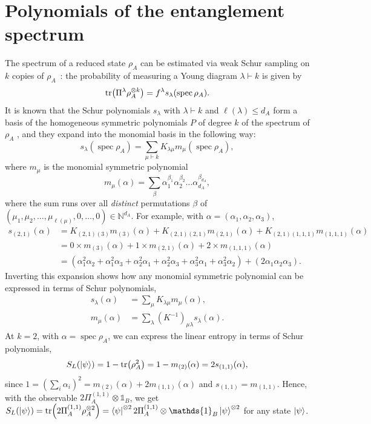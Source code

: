 \documentclass[11pt,a4paper]{report}
\DeclareMathOperator{\spec}{spec}
\newcommand{\one}{\mathds{1}}
\newcommand{\I}{\one}
\renewcommand{\a}{\alpha}
\newcommand{\N}{\mathds{N}}
\newcounter{reptag}
\newif\iftags \tagsfalse   %
\newcommand{\reptagbox}[3]{\iftags\par\smallskip\noindent\refstepcounter{reptag}%
  \fcolorbox{#1}{#1!7}{\parbox{\dimexpr\linewidth-2\fboxsep-2\fboxrule\relax}{\small
  \textcolor{#1}{\textbf{[\thereptag]\ #2.}}\ #3}}\par\smallskip\fi}
\newcommand{\detail}[1]{\reptagbox{tagD}{More detail}{#1}}
\begin{document}
\section{Polynomials of the entanglement spectrum}\label{ch:polynomial}
The spectrum of a reduced state $\rho_A$ can be estimated via weak Schur sampling on $k$ copies of $\rho_A$~\cite{Alicki1988,Keyl2001EstimatingSpectrum}: the probability of measuring a Young diagram $\lambda \vdash k$ is given by
\begin{equation}
    \tr(\Pi^\lambda \rho_A^{\otimes k}) = f^\lambda s_\lambda(\spec\rho_A).
\end{equation}
It is known that the Schur polynomials $s_\lambda$ with $\lambda \vdash k$ and $\ell(\lambda) \leq d_A$ form a basis of the homogeneous symmetric polynomials $P$ of degree $k$ of the spectrum of $\rho_A$ \cite{MacdonaldSymmFunc}, and they expand into the monomial basis in the following way:
\begin{equation}
    s_\lambda(\spec\rho_A) = \sum_{\mu \vdash k} K_{\lambda\mu}m_\mu(\spec\rho_A),
\end{equation}
where $m_\mu$ is the monomial symmetric polynomial
\begin{equation}
    m_\mu(\a) = \sum_{\beta} \a_1^{\beta_1}\a_2^{\beta_2}\dots\a_{d_A}^{\beta_{d_A}},
\end{equation}
where the sum runs over all {\em distinct} permutations $\beta$ of $(\mu_1, \mu_2, \dots, \mu_{\ell(\mu)}, 0,\dots, 0) \in \N^{d_A}$.
For example, with $\alpha=(\a_1,\a_2,\a_3)$,
\begin{align}
    s_{(2,1)}(\a) &= K_{(2,1)(3)}m_{(3)}(\a) + K_{(2,1)(2,1)}m_{(2,1)}(\a) + K_{(2,1)(1,1,1)}m_{(1,1,1)}(\a)\\
    &= 0 \times m_{(3)}(\a) + 1 \times m_{(2,1)}(\a) + 2 \times m_{(1,1,1)}(\a)\nonumber\\
    &= \left(\a_1^2\a_2 + \a_1^2\a_3 + \a_2^2\a_1 + \a_2^2\a_3 + \a_3^2\a_1 + \a_3^2\a_2\right) + \left(2 \a_1 \a_2 \a_3\right).\nonumber
\end{align}
Inverting this expansion shows how any monomial symmetric polynomial can be expressed in terms of Schur polynomials,
\begin{align}
    s_\lambda(\a) &= \sum_{\mu} K_{\lambda\mu} m_\mu(\a),\\
    m_\mu(\a) &= \sum_{\lambda} (K^{-1})_{\mu\lambda} s_\lambda(\a). \nonumber
\end{align}
At $k=2$, with $\a = \spec \rho_A$, we can express the linear entropy in terms of Schur polynomials,
\begin{equation}
    S_L(\ket{\psi}) = 1 - \tr(\rho_A^2) = 1 - m_{(2)}(\a) = 2s_{(1,1)}(\a),
\end{equation}
since $1=(\sum_i\a_i)^2=m_{(2)}(\a)+2m_{(1,1)}(\a)$ and $s_{(1,1)}=m_{(1,1)}$. Hence, with the observable $2\Pi^{(1,1)}_A \otimes \I_B$, we get $S_L(\ket{\psi}) = \tr(2\Pi^{(1,1)}_A \rho_A^{\otimes 2}) = \bra{\psi}^{\otimes 2} 2\Pi^{(1,1)}_A \otimes \I_B \ket{\psi}^{\otimes 2}$ for any state $\ket{\psi}$.
\detail{Say explicitly that $E_F$ and the Vidal monotones are \emph{not} polynomials, which motivates Chapter~\ref{sec:LP}.}
\end{document}
